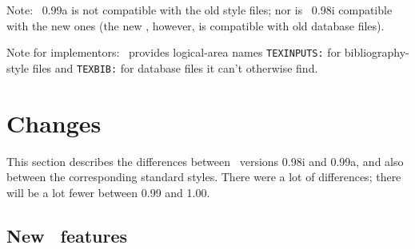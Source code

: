 Note: \BibTeX\ 0.99a is not compatible with the old style files;
nor is \BibTeX\ 0.98i compatible with the new ones
(the new \BibTeX, however, is compatible with old database files).

Note for implementors: \BibTeX\ provides logical-area names
\hbox{\tt TEXINPUTS:} for bibliography-style files and
\hbox{\tt TEXBIB:} for database files it can't otherwise find.


\section{Changes}
\label{differences}

This section describes the differences between
\BibTeX\ versions 0.98i and 0.99a, and also between
the corresponding standard styles.
There were a lot of differences;
there will be a lot fewer between 0.99 and 1.00.


\subsection{New \BibTeX\ features}
\label{features}

